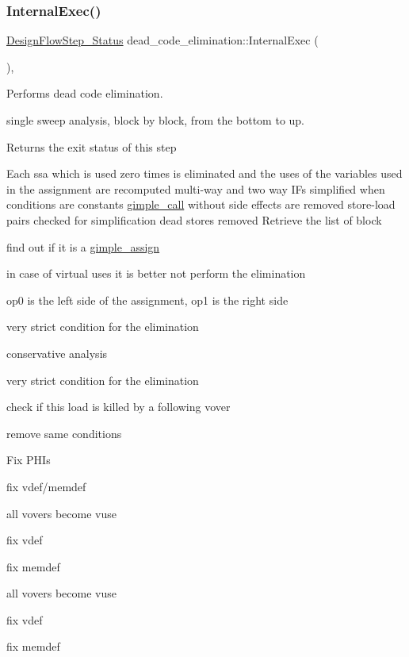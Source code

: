 \subsubsection{\texorpdfstring{Internal\+Exec()}{InternalExec()}}
{\footnotesize\ttfamily \hyperlink{design__flow__step_8hpp_afb1f0d73069c26076b8d31dbc8ebecdf}{Design\+Flow\+Step\+\_\+\+Status} dead\+\_\+code\+\_\+elimination\+::\+Internal\+Exec (\begin{DoxyParamCaption}{ }\end{DoxyParamCaption})\hspace{0.3cm}{\ttfamily [override]}, {\ttfamily [virtual]}}



Performs dead code elimination. 

single sweep analysis, block by block, from the bottom to up.

\begin{DoxyReturn}{Returns}
the exit status of this step
\end{DoxyReturn}
Each ssa which is used zero times is eliminated and the uses of the variables used in the assignment are recomputed multi-\/way and two way I\+Fs simplified when conditions are constants \hyperlink{structgimple__call}{gimple\+\_\+call} without side effects are removed store-\/load pairs checked for simplification dead stores removed Retrieve the list of block

find out if it is a \hyperlink{structgimple__assign}{gimple\+\_\+assign}

in case of virtual uses it is better not perform the elimination

op0 is the left side of the assignment, op1 is the right side

very strict condition for the elimination

conservative analysis

very strict condition for the elimination

check if this load is killed by a following vover

remove same conditions

Fix P\+H\+Is

fix vdef/memdef

all vovers become vuse

fix vdef

fix memdef

all vovers become vuse

fix vdef

fix memdef


